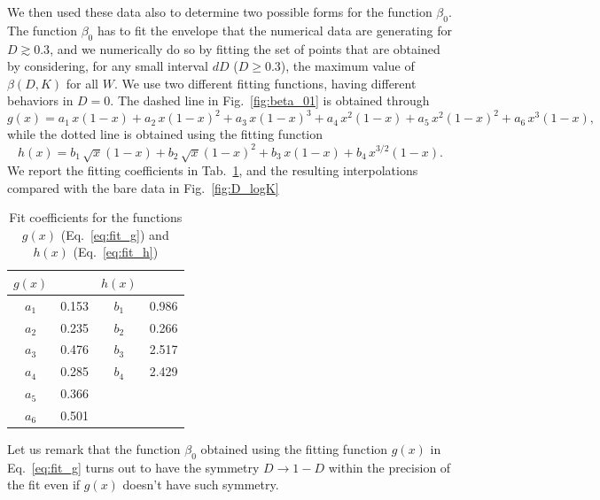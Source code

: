 \documentclass[reprint,aps,prl,superscriptaddress,english,nolongbibliography]{revtex4-1}
\begin{document}
We then used these data also to determine two possible forms for the function $\beta_0$. The function $\beta_0$ has to fit the envelope that the numerical data are generating for $D\gtrsim 0.3$, and we numerically do so by fitting the set of points that are obtained by considering, for any small interval $dD$ ($D \geq 0.3$), the maximum value of $\beta(D,K)$ for all $W$. We use two different fitting functions, having different behaviors in $D=0$. The dashed line in Fig.~\ref{fig:beta_01} is obtained through
\begin{equation}
\label{eq:fit_g}
    g(x) = a_1 \, x(1-x) + a_2 \, x(1-x)^2 + a_3 \, x(1-x)^3 + a_4 \, x^2(1-x) + a_5 \, x^2(1-x)^2 + a_6 \, x^3(1-x),
\end{equation}
while the dotted line is obtained using the fitting function
\begin{equation}
\label{eq:fit_h}
    h(x) = b_1 \, \sqrt{x}(1-x) + b_2 \, \sqrt{x}(1-x)^2 + b_3 \, x(1-x) + b_4 \, x^{3/2}(1-x).
\end{equation}
We report the fitting coefficients in Tab.~\ref{tab:fit}, and the resulting interpolations compared with the bare data in Fig.~\ref{fig:D_logK}

\begin{table}[ht!]
\begin{center}
\begin{tabular}{||c c | c c||} 

 \hline
 $g(x)$ &  & $h(x)$ & \\ [0.5ex] 
 \hline\hline
 $a_1$ \qquad & 0.153 & $b_1$ \qquad & 0.986 \\ 
 \hline
 $a_2$ \qquad & 0.235 & $b_2$ \qquad & 0.266 \\
 \hline
 $a_3$ \qquad & 0.476 & $b_3$ \qquad & 2.517 \\
 \hline
 $a_4$ \qquad & 0.285 & $b_4$ \qquad & 2.429 \\
 \hline
 $a_5$ \qquad & 0.366 &  &  \\
 \hline
 $a_6$ \qquad & 0.501 &  &  \\ [1ex] 
 \hline
\end{tabular}
\end{center}
\caption{Fit coefficients for the functions $g(x)$ (Eq.~\eqref{eq:fit_g}) and $h(x)$ (Eq.~\eqref{eq:fit_h})}
\label{tab:fit}
\end{table}


Let us remark that the function $\beta_0$ obtained using the fitting function $g(x)$ in Eq.~\eqref{eq:fit_g} turns out to have the symmetry $D \to 1-D$ within the precision of the fit even if $g(x)$ doesn't have such symmetry.
\end{document}
